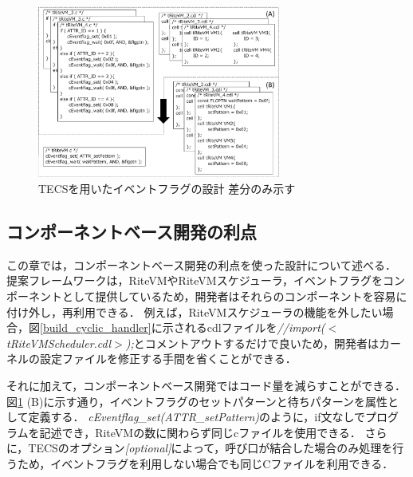 \documentclass[submit,techrep]{ipsj}
\begin{document}
\begin{figure}[t]
    \centering
    \includegraphics[width=8cm,clip]{../EMSOFT2016/figure/Eventflag.pdf}
    \vspace{-2mm}
    \caption{TECSを用いたイベントフラグの設計 {\scriptsize *差分のみ示す}}
\vspace{-3mm}
    \label{fig:Eventflag}
\end{figure}
\vspace{-5mm}
\subsection{コンポーネントベース開発の利点}
この章では，コンポーネントベース開発の利点を使った設計について述べる．
提案フレームワークは，RiteVMやRiteVMスケジューラ，イベントフラグをコンポーネントとして提供しているため，開発者はそれらのコンポーネントを容易に付け外し，再利用できる．
例えば，RiteVMスケジューラの機能を外したい場合，図\ref{build_cyclic_handler}に示されるcdlファイルを{\it //import($<$tRiteVMScheduler.cdl$>$);}とコメントアウトするだけで良いため，開発者はカーネルの設定ファイルを修正する手間を省くことができる．

それに加えて，コンポーネントベース開発ではコード量を減らすことができる．
図\ref{fig:Eventflag} (B)に示す通り，イベントフラグのセットパターンと待ちパターンを属性として定義する．
{\it cEventflag\_set(ATTR\_setPattern)}のように，if文なしでプログラムを記述でき，RiteVMの数に関わらず同じcファイルを使用できる．
さらに，TECSのオプション{\it [optional]}によって，呼び口が結合した場合のみ処理を行うため，イベントフラグを利用しない場合でも同じCファイルを利用できる．

\vspace{-2mm}
\end{document}
